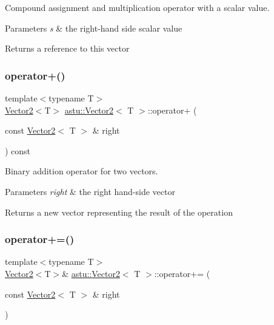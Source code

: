 Compound assignment and multiplication operator with a scalar value.


\begin{DoxyParams}{Parameters}
{\em s} & the right-\/hand side scalar value \\
\hline
\end{DoxyParams}
\begin{DoxyReturn}{Returns}
a reference to this vector 
\end{DoxyReturn}
\mbox{\label{classastu_1_1Vector2_a1ebf3c3f9ef6c8e07f6ea2327a630fca}} 
\subsubsection{\texorpdfstring{operator+()}{operator+()}}
{\footnotesize\ttfamily template$<$typename T$>$ \\
\hyperlink{classastu_1_1Vector2}{Vector2}$<$T$>$ \hyperlink{classastu_1_1Vector2}{astu\+::\+Vector2}$<$ T $>$\+::operator+ (\begin{DoxyParamCaption}\item[{const \hyperlink{classastu_1_1Vector2}{Vector2}$<$ T $>$ \&}]{right }\end{DoxyParamCaption}) const\hspace{0.3cm}{\ttfamily [inline]}}

Binary addition operator for two vectors.


\begin{DoxyParams}{Parameters}
{\em right} & the right hand-\/side vector \\
\hline
\end{DoxyParams}
\begin{DoxyReturn}{Returns}
a new vector representing the result of the operation 
\end{DoxyReturn}
\mbox{\label{classastu_1_1Vector2_a285af566f7b2e4a218932094ab9a70f8}} 
\subsubsection{\texorpdfstring{operator+=()}{operator+=()}}
{\footnotesize\ttfamily template$<$typename T$>$ \\
\hyperlink{classastu_1_1Vector2}{Vector2}$<$T$>$\& \hyperlink{classastu_1_1Vector2}{astu\+::\+Vector2}$<$ T $>$\+::operator+= (\begin{DoxyParamCaption}\item[{const \hyperlink{classastu_1_1Vector2}{Vector2}$<$ T $>$ \&}]{right }\end{DoxyParamCaption})\hspace{0.3cm}{\ttfamily [inline]}}

